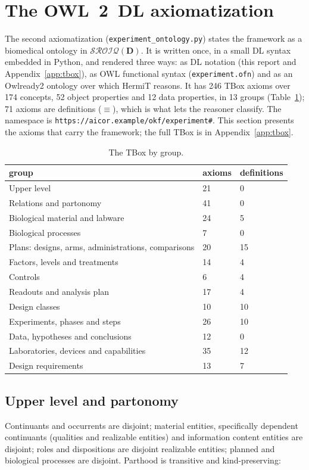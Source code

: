 \documentclass[10pt,a4paper]{article}
\begin{document}
\section{The OWL~2~DL axiomatization}\label{sec:owl}
The second axiomatization (\texttt{experiment\_\allowbreak{}ontology.py}) states the framework as a biomedical ontology in
$\mathcal{SROIQ}(\mathbf{D})$. It is written once, in a small DL syntax embedded in Python, and rendered three ways:
as DL notation (this report and Appendix~\ref{app:tbox}), as OWL functional syntax (\texttt{experiment.ofn}) and as
an Owlready2 ontology \citep{lamy2017} over which HermiT \citep{glimm2014} reasons. It has 246 TBox axioms over
174 concepts, 52 object properties and 12 data properties, in 13 groups
(Table~\ref{tab:tbox}); 71 axioms are definitions ($\equiv$), which is what lets the reasoner classify. The
namespace is \texttt{https://aicor.example/okf/experiment\#}. This section presents the axioms that carry the
framework; the full TBox is in Appendix~\ref{app:tbox}.

\begin{table}[tbp]\centering\small
\caption{The TBox by group.}\label{tab:tbox}
\begin{tabularx}{\linewidth}{@{}Xp{2.2cm}p{2.2cm}@{}}\toprule group & axioms & definitions \\ \midrule
Upper level & 21 & 0 \\
Relations and partonomy & 41 & 0 \\
Biological material and labware & 24 & 5 \\
Biological processes & 7 & 0 \\
Plans: designs, arms, administrations, comparisons & 20 & 15 \\
Factors, levels and treatments & 14 & 4 \\
Controls & 6 & 4 \\
Readouts and analysis plan & 17 & 4 \\
Design classes & 10 & 10 \\
Experiments, phases and steps & 26 & 10 \\
Data, hypotheses and conclusions & 12 & 0 \\
Laboratories, devices and capabilities & 35 & 12 \\
Design requirements & 13 & 7 \\
\bottomrule\end{tabularx}\end{table}


\subsection{Upper level and partonomy}
Continuants and occurrents are disjoint; material entities, specifically dependent continuants (qualities and
realizable entities) and information content entities are disjoint; roles and dispositions are disjoint realizable
entities; planned and biological processes are disjoint. Parthood is transitive and kind-preserving:
\end{document}
